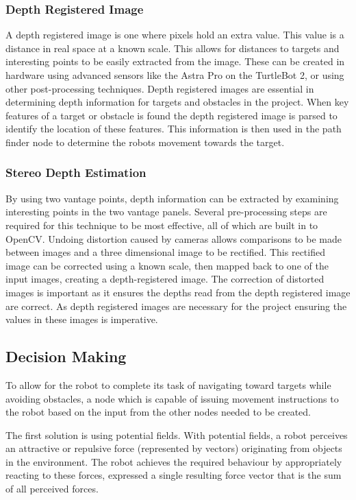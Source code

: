 \documentclass{article}[12]
\begin{document}
		\subsubsection{Depth Registered Image}

A depth registered image is one where pixels hold an extra value. This value is a distance in real space at a known scale. This allows for distances to targets and interesting points to be easily extracted from the image. These can be created in hardware using advanced sensors like the Astra Pro on the TurtleBot 2, or using other post-processing techniques. Depth registered images are essential in determining depth information for targets and obstacles in the project. When key features of a target or obstacle is found the depth registered image is parsed to identify the location of these features. This information is then used in the path finder node to determine the robots movement towards the target.   
		
		\subsubsection{Stereo Depth Estimation}
		
		By using two vantage points, depth information can be extracted by examining interesting points in the two vantage panels. Several pre-processing steps are required for this technique to be most effective, all of which are built in to OpenCV. Undoing distortion caused by cameras allows comparisons to be made between images and a three dimensional image to be rectified. This rectified image can be corrected using a known scale, then mapped back to one of the input images, creating a depth-registered image. The correction of distorted images is important as it ensures the depths read from the depth registered image are correct. As depth registered images are necessary for the project ensuring the values in these images is imperative.
		
	
	\subsection{Decision Making}
	
	To allow for the robot to complete its task of navigating toward targets while avoiding obstacles, a node which is capable of issuing movement instructions to the robot based on the input from the other nodes needed to be created. 
	
The first solution is using potential fields. With potential fields, a robot perceives an attractive or repulsive force (represented by vectors) originating from objects in the environment. The robot achieves the required behaviour by appropriately reacting to these forces, expressed a single resulting force vector that is the sum of all perceived forces. \cite{hwang1992potential}
\end{document}
